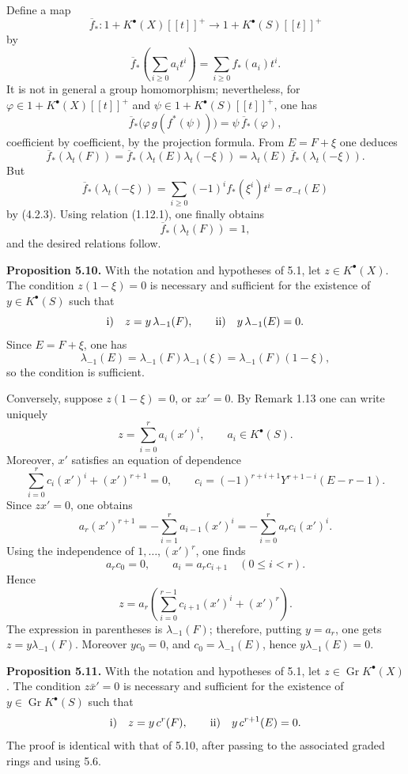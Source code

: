 \documentclass[11pt]{article}
\begin{document}
Define a map
\[
  \overline f_*:1+K^\bullet(X)[[t]]^+
       \longrightarrow 1+K^\bullet(S)[[t]]^+
\]
by
\[
  \overline f_*\left(\sum_{i\geq0}a_i t^i\right)
  =
  \sum_{i\geq0}f_*(a_i)t^i.
\]
It is not in general a group homomorphism; nevertheless, for
\(\varphi\in 1+K^\bullet(X)[[t]]^+\) and
\(\psi\in 1+K^\bullet(S)[[t]]^+\), one has
\[
  \overline f_*\bigl(\varphi\, g(f^*(\psi))\bigr)
  =
  \psi\,\overline f_*(\varphi),
\]
coefficient by coefficient, by the projection formula. From \(E=F+\xi\) one deduces
\[
  \overline f_*(\lambda_t(F))
  =
  \overline f_*(\lambda_t(E)\lambda_t(-\xi))
  =
  \lambda_t(E)\,\overline f_*(\lambda_t(-\xi)).
\]
But
\[
  \overline f_*(\lambda_t(-\xi))
  =
  \sum_{i\geq0}(-1)^i f_*(\xi^i)t^i
  =
  \sigma_{-t}(E)
\]
by (4.2.3). Using relation (1.12.1), one finally obtains
\[
  \overline f_*(\lambda_t(F))=1,
\]
and the desired relations follow.

\textbf{Proposition 5.10.} With the notation and hypotheses of 5.1, let \(z\in K^\bullet(X)\). The condition \(z(1-\xi)=0\) is necessary and sufficient for the existence of \(y\in K^\bullet(S)\) such that
\[
  \text{\rm i)}\quad z=y\,\lambda_{-1}(F),
  \qquad
  \text{\rm ii)}\quad y\,\lambda_{-1}(E)=0.
\]
Since \(E=F+\xi\), one has
\[
  \lambda_{-1}(E)=\lambda_{-1}(F)\lambda_{-1}(\xi)
  =\lambda_{-1}(F)(1-\xi),
\]
so the condition is sufficient.

Conversely, suppose \(z(1-\xi)=0\), or \(zx'=0\). By Remark 1.13 one can write uniquely
\[
  z=\sum_{i=0}^{r}a_i(x')^i,\qquad a_i\in K^\bullet(S).
\]
Moreover, \(x'\) satisfies an equation of dependence
\[
  \sum_{i=0}^{r}c_i(x')^i+(x')^{r+1}=0,
\qquad
  c_i=(-1)^{r+i+1}Y^{r+1-i}(E-r-1).
\]
Since \(zx'=0\), one obtains
\[
  a_r(x')^{r+1}
  =
  -\sum_{i=1}^{r}a_{i-1}(x')^i
  =
  -\sum_{i=0}^{r}a_rc_i(x')^i.
\]
Using the independence of \(1,\ldots,(x')^r\), one finds
\[
  a_rc_0=0,\qquad a_i=a_rc_{i+1}\quad(0\leq i<r).
\]
Hence
\[
  z=a_r\left(\sum_{i=0}^{r-1}c_{i+1}(x')^i+(x')^r\right).
\]
The expression in parentheses is \(\lambda_{-1}(F)\); therefore, putting \(y=a_r\), one gets \(z=y\lambda_{-1}(F)\). Moreover \(yc_0=0\), and \(c_0=\lambda_{-1}(E)\), hence \(y\lambda_{-1}(E)=0\).

\textbf{Proposition 5.11.} With the notation and hypotheses of 5.1, let \(z\in\operatorname{Gr}K^\bullet(X)\). The condition \(z\bar x'=0\) is necessary and sufficient for the existence of \(y\in\operatorname{Gr}K^\bullet(S)\) such that
\[
  \text{\rm i)}\quad z=y\,c^r(F),
  \qquad
  \text{\rm ii)}\quad y\,c^{r+1}(E)=0.
\]
The proof is identical with that of 5.10, after passing to the associated graded rings and using 5.6.
\end{document}
